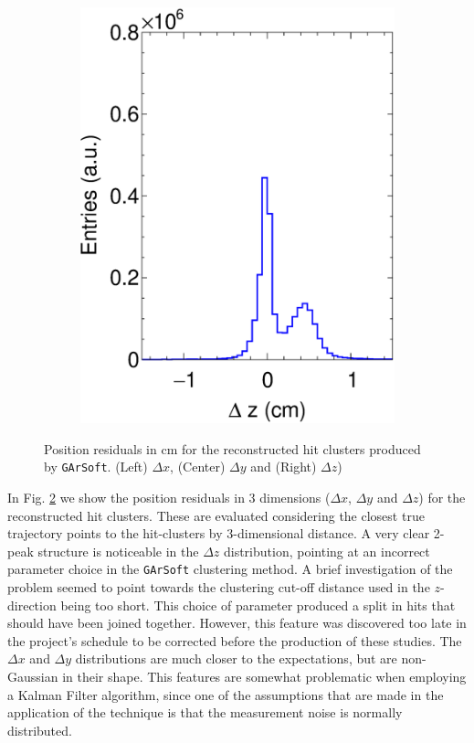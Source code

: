 \begin{figure}[t]
\begin{subfigure}[b]{0.32\textwidth}
         \includegraphics[width=\textwidth]{figures/ch5-KF_NDGAr/FullSample/Int/Props/ResZ.eps}
         \caption{}
         \label{fig:TPCZRes_Int}
     \end{subfigure}
        \caption[Position residuals in cm for the reconstructed hit clusters produced by \texttt{GArSoft}.]{Position residuals in cm for the reconstructed hit clusters produced by \texttt{GArSoft}. (Left) $\Delta x$, (Center) $\Delta y$ and (Right) $\Delta z$) } \label{fig:TPCPosRes_Int}
\end{figure}

In Fig. \ref{fig:TPCPosRes_Int} we show the position residuals in 3 dimensions ($\Delta x$, $\Delta y$ and $\Delta z$) for the reconstructed hit clusters. These are evaluated considering the closest true trajectory points to the hit-clusters by 3-dimensional distance. A very clear 2-peak structure is noticeable in the $\Delta z$ distribution, pointing at an incorrect parameter choice in the \texttt{GArSoft} clustering method. A brief investigation of the problem seemed to point towards the clustering cut-off distance used in the $z$-direction being too short. This choice of parameter produced a split in hits that should have been joined together. However, this feature was discovered too late in the project's schedule to be corrected before the production of these studies. The $\Delta x$ and $\Delta y$ distributions are much closer to the expectations, but are  non-Gaussian in their shape. This features are somewhat problematic when employing a Kalman Filter algorithm, since one of the assumptions that are made in the application of the technique is that the measurement noise is normally distributed. 

